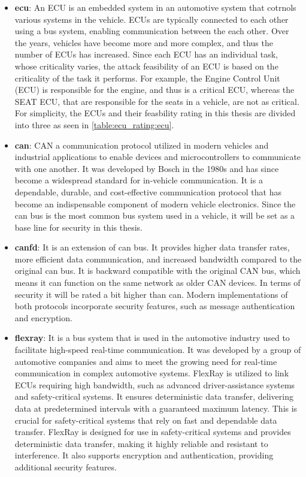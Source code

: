 \begin{itemize}
    \item \textbf{\gls{ecu}}: An ECU is an embedded system in an automotive system that cotrnols various systems in the vehicle.
    ECUs are typically connected to each other using a bus system, enabling communication between the each other.
    Over the years, vehicles have become more and more complex, and thus the number of ECUs has increased.
    Since each ECU has an individual task, whose criticality varies, the attack feasibility of an ECU is based on the criticality of the task it performs.
    For example, the Engine Control Unit (ECU) is responsible for the engine, and thus is a critical ECU, 
    whereas the SEAT ECU, that are responsible for the seats in a vehicle, are not as critical.
    For simplicity, the ECUs and their feasbility rating in this thesis are divided into three as seen in \ref{table:ecu_rating:ecu}.
    
    \item \textbf{\gls{can}}: CAN a communication protocol utilized in modern vehicles and industrial applications 
    to enable devices and microcontrollers to communicate with one another. 
    It was developed by Bosch in the 1980s and has since become a widespread standard for in-vehicle communication.
    It is a dependable, durable, and cost-effective communication protocol that has become an indispensable component of modern vehicle electronics.
    Since the \gls{can} bus is the most common bus system used in a vehicle, it will be set as a base line for security in this thesis.

    \item \textbf{\gls{canfd}}: It is an extension of \gls{can} bus.
    It provides higher data transfer rates, more efficient data communication, and increased bandwidth compared to the original \gls{can} bus.
    It is backward compatible with the original CAN bus, which means it can function on the same network as older CAN devices.
    In terms of security it will be rated a bit higher than \gls{can}.
    Modern implementations of both protocols incorporate security features, such as message authentication and encryption.
    
    \item \textbf{\gls{flexray}}: It is a bus system that is used in the automotive industry used to facilitate high-speed real-time communication.
    It was developed by a group of automotive companies and aims to meet the growing need for real-time communication in complex automotive systems.
    FlexRay is utilized to link ECUs requiring high bandwidth, such as advanced driver-assistance systems and safety-critical systems. 
    It ensures deterministic data transfer, delivering data at predetermined intervals with a guaranteed maximum latency. 
    This is crucial for safety-critical systems that rely on fast and dependable data transfer.
    FlexRay is designed for use in safety-critical systems and provides deterministic data transfer, making it highly reliable and resistant to interference. 
    It also supports encryption and authentication, providing additional security features.


\end{itemize}
